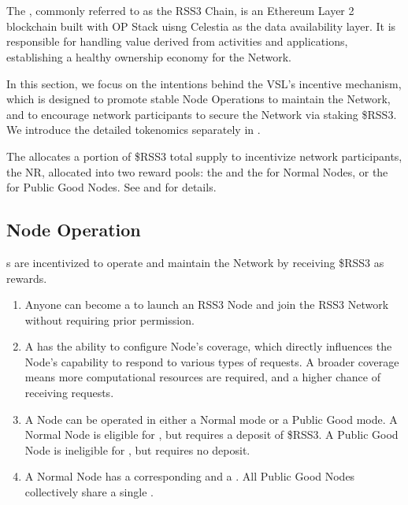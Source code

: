 \section{}
\label{sec:VSL}

The , commonly referred to as the RSS3 Chain, is an Ethereum Layer 2 blockchain built with OP Stack uisng Celestia as the data availability layer.
It is responsible for handling value derived from  activities and applications, establishing a healthy ownership economy for the Network.

In this section, we focus on the intentions behind the \gls{VSL}'s incentive mechanism, which is designed to promote stable Node Operations to maintain the Network, and to encourage network participants to secure the Network via staking \$RSS3.
We introduce the detailed tokenomics separately in .

The  allocates a portion of \$RSS3 total supply to incentivize network participants, the \gls{NR}, 
allocated into two reward pools: the  and the  for Normal Nodes, or the  for Public Good Nodes.
See  and  for details.

\subsection{Node Operation}
s are incentivized to operate and maintain the Network by receiving \$RSS3 as rewards.
\begin{enumerate}
    \item Anyone can become a  to launch an RSS3 Node and join the RSS3 Network without requiring prior permission.
    \item A  has the ability to configure Node's coverage, which directly influences the Node's capability to respond to various types of requests. A broader coverage means more computational resources are required, and a higher chance of receiving requests.
    \item A Node can be operated in either a Normal mode or a Public Good mode. A Normal Node is eligible for , but requires a deposit of \$RSS3. A Public Good Node is ineligible for , but requires no deposit.
    \item A Normal Node has a corresponding  and a . All Public Good Nodes collectively share a single .
\end{enumerate}

